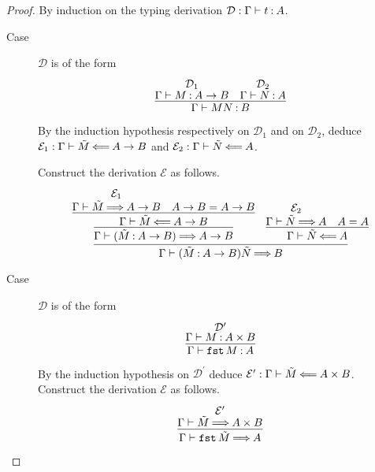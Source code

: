 \documentclass[11pt,letterpaper]{article}
\begin{document}
\begin{proof}
  By induction on the typing derivation
  $\mathcal{D} : \Gamma \vdash t \mathbin{:} A$.
  \begin{description}
    \item[Case]
      $\mathcal{D}$ is of the form
      \begin{equation*}
        \infer{
          \Gamma \proves M N \hastype B
        }{
          \deduce[\mathcal{D}_1]{\Gamma \proves M \hastype A \to B}{}
          &
          \deduce[\mathcal{D}_2]{\Gamma \proves N \hastype A}{}
        }
      \end{equation*}

      By the induction hypothesis respectively on $\mathcal{D}_1$ and on
      $\mathcal{D}_2$,
      deduce $\mathcal{E}_1 : \Gamma \vdash \tilde M \mathbin{\Longleftarrow} A \to B$
      and $\mathcal{E}_2 : \Gamma \vdash \tilde N \mathbin{\Longleftarrow} A$.

      Construct the derivation $\mathcal{E}$ as follows.
      \begin{equation*}
        \infer{
          \Gamma \proves (\tilde M \hastype A \to B) \tilde N \synth B
        }{
          \infer{
            \Gamma \proves (\tilde M \hastype A \to B) \synth A \to B
          }{
            \infer{
              \Gamma \proves \tilde M \checks A \to B
            }{
              \deduce[\mathcal{E}_1]{\Gamma \proves \tilde M \synth A \to B}{}
              &
              A \to B = A \to B
            }
          }
          &
          \infer{
            \Gamma \proves \tilde N \checks A
          }{
            \deduce[\mathcal{E}_2]{\Gamma \proves \tilde N \synth A}{}
            &
            A = A
          }
        }
      \end{equation*}

    \item[Case]
      $\mathcal{D}$ is of the form
      \begin{equation*}
        \infer{
          \Gamma \proves \fst M \hastype A
        }{
          \deduce[\mathcal{D}^\prime]{\Gamma \proves M \hastype A \times B}{}
        }
      \end{equation*}

      By the induction hypothesis on $\mathcal{D}^\prime$
      deduce $\mathcal{E}^\prime : \Gamma \vdash \tilde M \mathbin{\Longleftarrow} A \times B$.
      Construct the derivation $\mathcal{E}$ as follows.
      \begin{equation*}
        \infer{
          \Gamma \proves \fst \tilde M \synth A
        }{
          \deduce[\mathcal{E}^\prime]{
            \Gamma \proves \tilde M \synth A \times B
          }{}
        }
      \end{equation*}


\end{description}
\end{proof}
\end{document}
